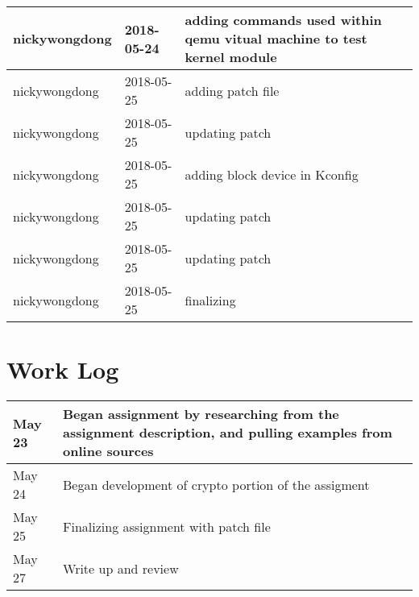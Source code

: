 \documentclass[onecolumn, draftclsnofoot,10pt, compsoc]{IEEEtran}
\begin{document}
\begin{longtable} {|l|l|p{13cm}|}
nickywongdong & 2018-05-24 & adding commands used within qemu vitual machine to test kernel module \\ \hline
nickywongdong & 2018-05-25 & adding patch file \\ \hline
nickywongdong & 2018-05-25 & updating patch \\ \hline
nickywongdong & 2018-05-25 & adding block device in Kconfig \\ \hline
nickywongdong & 2018-05-25 & updating patch \\ \hline
nickywongdong & 2018-05-25 & updating patch \\ \hline
nickywongdong & 2018-05-25 & finalizing \\ \hline

\end{longtable}


\section{Work Log}
\begin{tabular}{|l|l|}
\hline
     May 23 & Began assignment by researching from the assignment description, and pulling examples from online sources\\\hline
     May 24 & Began development of crypto portion of the assigment\\\hline
     May 25 & Finalizing assignment with patch file\\\hline
     May 27 & Write up and review \\ \hline

\end{tabular}

\newpage
\end{document}
